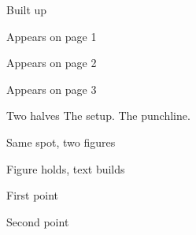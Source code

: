 
\begin{frame}{Built up}
  \begin{steps}
    \item Appears on page 1
    \item Appears on page 2
    \item Appears on page 3
  \end{steps}
\end{frame}

\begin{frame}{Two halves}
  The setup.
  \stepafter
  The punchline.
\end{frame}


\begin{frame}{Same spot, two figures}
\end{frame}


\begin{frame}{Figure holds, text builds}
  \begin{figuretext}[0.55]
    \begin{steps}
      \item First point
      \item Second point
    \end{steps}
    \nextpane
  \end{figuretext}
\end{frame}

